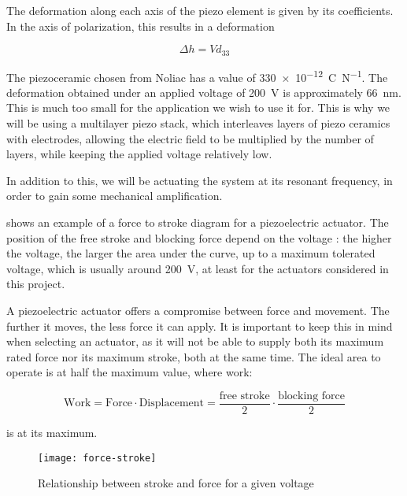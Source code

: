 The deformation along each axis of the piezo element is given by its
coefficients. In the axis of polarization, this results in a deformation

\begin{equation}
  \Delta h = V d_{33}
  \label{eq:delta-h}
\end{equation}

The piezoceramic chosen from Noliac has a value of
\SI[per-mode=fraction]{330e-12}{\coulomb\per\newton}. The deformation obtained
under an applied voltage of \SI{200}{\volt} is approximately
\SI{66}{\nano\metre}. This is much too small for the application we wish to use
it for. This is why we will be using a multilayer piezo stack, which interleaves
layers of piezo ceramics with electrodes, allowing the electric field to be
multiplied by the number of layers, while keeping the applied voltage relatively
low. 

In addition to this, we will be actuating the system at its resonant frequency,
in order to gain some mechanical amplification.

 shows an example of a force to stroke diagram for a
piezoelectric actuator. The position of the free stroke and blocking force
depend on the voltage : the higher the voltage, the larger the area under the
curve, up to a maximum tolerated voltage, which is usually around
\SI{200}{\volt}, at least for the actuators considered in this project.

A piezoelectric actuator offers a compromise between force and movement. The
further it moves, the less force it can apply. It is important to keep this in
mind when selecting an actuator, as it will not be able to supply both its
maximum rated force nor its maximum stroke, both at the same time. The ideal
area to operate is at half the maximum value, where work:

\begin{equation}
  \mathrm{Work = Force \cdot Displacement} = 
  \frac{\textrm{free stroke}}{2} \cdot \frac{\textrm{blocking force}}{2}
  \label{eq:work}
\end{equation}

is at its maximum.

\begin{figure}[h!]
  \begin{center}
    \texttt{[image: force-stroke]}
  \end{center}
  \caption{Relationship between stroke and force for a given voltage}
  \label{fig:force-stroke}
\end{figure}

